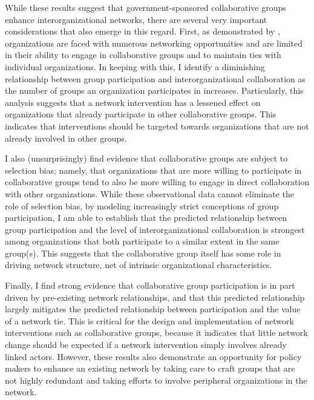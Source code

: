 \documentclass[12pt,a4paper,titlepage]{article}
\begin{document}
While these results suggest that government-sponsored collaborative groups enhance interorganizational networks, there are several very important considerations that also emerge in this regard. First, as demonstrated by \textcite{lubell2010, lubell2011-a}, organizations are faced with numerous networking opportunities and are limited in their ability to engage in collaborative groups and to maintain ties with individual organizations. In keeping with this, I identify a diminishing relationship between group participation and interorganizational collaboration as the number of groups an organization participates in increases. Particularly, this analysis suggests that a network intervention has a lessened effect on organizations that already participate in other collaborative groups. This indicates that interventions should be targeted towards organizations that are not already involved in other groups.

I also (unsurprisingly) find evidence that collaborative groups are subject to selection bias; namely, that organizations that are more willing to participate in collaborative groups tend to also be more willing to engage in direct collaboration with other organizations. While these observational data cannot eliminate the role of selection bias, by modeling increasingly strict conceptions of group participation, I am able to establish that the predicted relationship between group participation and the level of interorganizational collaboration is strongest among organizations that both participate to a similar extent in the same group(s). This suggests that the collaborative group itself has some role in driving network structure, net of intrinsic organizational characteristics.

Finally, I find strong evidence that collaborative group participation is in part driven by pre-existing network relationships, and that this predicted relationship largely mitigates the predicted relationship between participation and the value of a network tie. This is critical for the design and implementation of network interventions such as collaborative groups, because it indicates that little network change should be expected if a network intervention simply involves already linked actors. However, these results also demonstrate an opportunity for policy makers to enhance an existing network by taking care to craft groups that are not highly redundant and taking efforts to involve peripheral organizations in the network.
\end{document}
